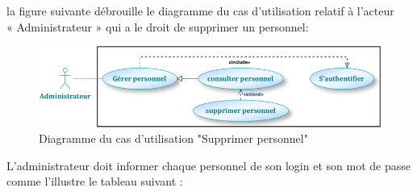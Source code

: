 \documentclass[12 pt ]{report}
\begin{document}
la figure suivante débrouille le diagramme du cas d’utilisation  relatif à l’acteur \\« Administrateur » qui a le droit de supprimer un personnel:
\begin{figure}[h]
 \begin{center}
\includegraphics[width=12 cm ,height= 4 cm]{a5.PNG}
\caption{Diagramme du cas d’utilisation "Supprimer personnel"}
\end{center}
\end{figure}
\newpage
L’administrateur doit informer chaque personnel de son login et son mot de passe comme l'illustre le tableau suivant :
\end{document}
